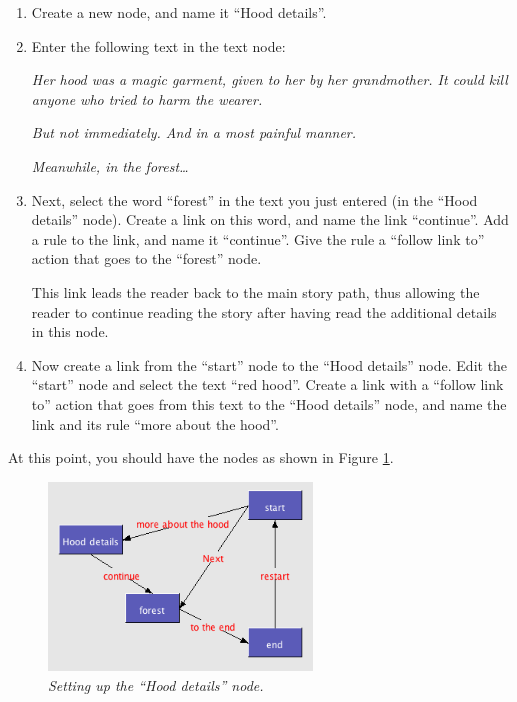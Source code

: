 \documentclass{article}
\begin{document}
\begin{enumerate}
  \item Create a new node, and name it ``Hood details''.
  \item Enter the following text in the text node:

\textit{Her hood was a magic garment, given to her by her grandmother.
It could kill anyone who tried to harm the wearer.}

\textit{But not immediately. And in a most painful manner.}

\textit{Meanwhile, in the forest\ldots}

\item Next, select the word ``forest'' in the text you just entered (in the
``Hood details'' node). Create a link on this word, and name the link
``continue''. Add a rule to the link, and name it ``continue''. Give the rule a
``follow link to'' action that goes to the ``forest'' node.

This link leads the reader back to the main story path, thus allowing the
reader to continue reading the story after having read the additional details in
this node.

\item Now create a link from the ``start'' node to the ``Hood details'' node.
Edit the ``start'' node and select the text ``red hood''. Create a link with a
``follow link to'' action that goes from this text to the ``Hood details'' node,
and name the link and its rule ``more about the hood''.
\end{enumerate}

At this point, you should have the nodes as shown in Figure
\ref{fig:setting_up_hood_details}.

 
\begin{figure}[ht]
  \centering
  \includegraphics[width=7cm]{images/hypedyn-tutorial-1-figure-12}
  \caption{\textit{Setting up the ``Hood details'' node.}}
  \label{fig:setting_up_hood_details}
\end{figure} 
\end{document}
